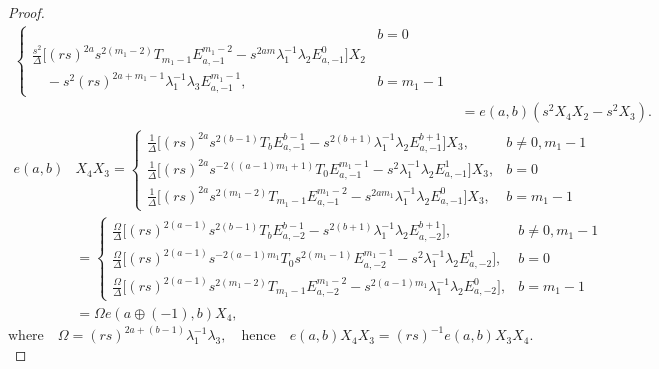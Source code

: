 \documentclass[12 pt,reqno]{amsart}
\numberwithin{equation}{section}
\theoremstyle{definition}
\theoremstyle{definition}
\theoremstyle{remark}
\theoremstyle{remark}
\begin{document}
\begin{proof}
\begin{align*}
\begin{cases}
        &  b = 0\\[7pt]
         \displaystyle \frac{s^2}{\Delta} \Bigg[ 
            (rs)^{2a} s^{2(m_1-2)} T_{m_1-1}  
            E^{m_1-2}_{a,-1}- s^{2am} \lambda_1^{-1} \lambda_2 E^{0}_{a,-1}\Bigg]X_2\\ \quad-s^2(rs)^{2a+m_1-1}\lambda_1^{-1}\lambda_3E^{m_1-1}_{a,-1},  
        &  b =m_1 - 1
        \end{cases}\\[7pt] &=e(a,b)(s^2X_4X_2-s^2X_3).\end{align*}
\begin{align*}
         e(a,b)&X_4X_3=\begin{cases}
        \displaystyle \frac{1}{\Delta} \Bigg[ 
            (rs)^{2a} s^{2(b-1)} T_b 
            E^{b-1}_{a,-1}- s^{2(b+1)} \lambda_1^{-1} \lambda_2 E^{b+1}_{a,-1} 
        \Bigg]X_3,  
        &  b \neq 0, m_1 - 1 \\[15pt]
\displaystyle\frac{1}{\Delta} \Bigg[ 
            (rs)^{2a} s^{-2 ((a-1) m_1+1)} 
            T_0 E^{m_1-1}_{a,-1} 
            - s^{2} \lambda_1^{-1} \lambda_2 E^{1}_{a,-1} 
        \Bigg]X_3,  
        &  b = 0 \\[15pt]
\displaystyle\frac{1}{\Delta} \Bigg[ 
            (rs)^{2a} s^{2(m_1 - 2)} T_{m_1-1}
            E^{m_1-2}_{a,-1} - s^{2 a m_1} \lambda_1^{-1} \lambda_2 E^{0}_{a,-1} 
        \Bigg] X_3,  
        & b = m_1 - 1
    \end{cases}\\[2pt]
         &=\begin{cases}
        \displaystyle \frac{\Omega}{\Delta} \Bigg[ 
            (rs)^{2(a-1)} s^{2(b-1)} T_b           E^{b-1}_{a,-2}- s^{2(b+1)} \lambda_1^{-1} \lambda_2 E^{b+1}_{a,-2} 
        \Bigg], 
        &  b \neq 0, m_1 - 1 \\[13pt]
\displaystyle\frac{\Omega}{\Delta} \Bigg[ 
            (rs)^{2(a-1)} s^{-2 (a-1) m_1} T_0  s^{2(m_1-1)} E^{m_1-1}_{a,-2}  
            - s^{2} \lambda_1^{-1} \lambda_2 E^{1}_{a,-2} 
        \Bigg],  
        &  b = 0 \\[13pt]
\displaystyle\frac{\Omega}{\Delta} \Bigg[ 
            (rs)^{2(a-1)} s^{2(m_1 - 2)} T_{m_1-1}
           E^{m_1-2}_{a,-2} - s^{2 (a-1) m_1} \lambda_1^{-1} \lambda_2 E^{0}_{a,-2}
        \Bigg],  
        & b = m_1 - 1
    \end{cases}\\[2pt]
    &=\Omega e(a\oplus(-1),b)X_4,\end{align*}
    $\text{where}\quad\Omega=(rs)^{2a+(b-1)}\lambda_1^{-1}\lambda_3,\quad \text{hence}\quad e(a,b)X_4X_3=(rs)^{-1}e(a,b)X_3X_4.$
\end{proof}
\end{document}
